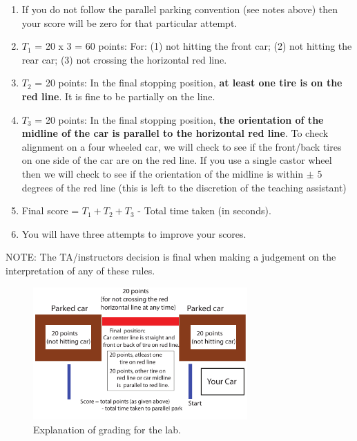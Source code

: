 \documentclass[11pt]{article}
\def\bluehref#1#2{\href{#1}{\color{blue} #2}}
\begin{document}
\begin{enumerate}
\item If you do not follow the parallel parking convention (see notes above) then your score will be zero for that particular attempt. 
\item {$T_1$ = 20 x 3 = 60 points:} For: (1) not hitting the front car; (2) not hitting the rear car; (3) not crossing the horizontal red line.
\item {$T_2$ = 20 points:} In the final stopping position, {\bf at least one tire is on the red line}. It is fine to be partially on the line. 
\item {$T_3$ = 20 points:} In the final stopping position, {\bf the orientation of the midline of the car is parallel to the horizontal red line}. To check alignment on a four wheeled car, we will check to see if the front/back tires on one side of the car are on the red line. If you use a single castor wheel then we will check to see if the orientation of the midline is within $\pm$ $5$ degrees of the red line (this is left to the discretion of the teaching assistant)
\item Final score = $T_1+T_2+T_3$ - Total time taken (in seconds).
\item You will have three attempts to improve your scores. 
\end{enumerate}
NOTE: The TA/instructors decision is final when making a judgement on the interpretation of any of these rules. 
\begin{figure}[t]
\begin{center}
 \includegraphics[angle=0, height=2.0in]{figures/lab4_parallel_park4.pdf}
\end{center}
 \caption{Explanation of grading for the lab.}
   \label{fig:lab4-grading}
\end{figure}
\end{document}
